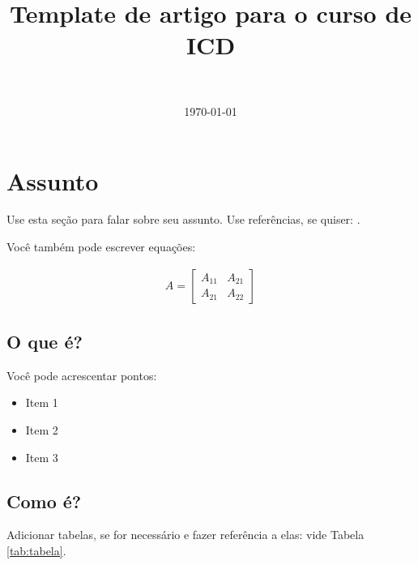 \documentclass[10pt, a4paper, twocolumn]{article}
\title{Template de artigo para o curso de ICD} %
\author{
	\authorstyle{Augustus Norius\textsuperscript{1,2}} \\ %
}
\date{\today}
\begin{document}
\maketitle %
\thispagestyle{firstpage} 





\section*{Assunto}

Use esta seção para falar sobre seu assunto. Use referências, se quiser: \citep{ref1} \citep{ref2}. 

Você também pode escrever equações:

\lipsum[1-2]

\begin{align}
	A = 
	\begin{bmatrix}
		A_{11} & A_{21} \\
		A_{21} & A_{22}
	\end{bmatrix}
\end{align}

\lipsum[1]

\subsection*{O que é?}

Você pode acrescentar pontos:

\begin{itemize}
	\item Item 1
	\item Item 2
	\item Item 3
\end{itemize}

\subsection*{Como é?}

Adicionar tabelas, se for necessário e fazer referência a elas: vide Tabela \ref{tab:tabela}.
\end{document}
